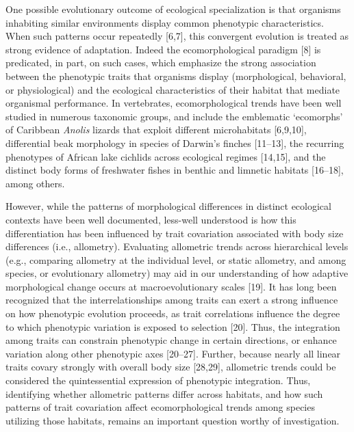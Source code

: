 \documentclass[
  11pt,
]{article}
\begin{document}
One possible evolutionary outcome of ecological specialization is that
organisms inhabiting similar environments display common phenotypic
characteristics. When such patterns occur repeatedly {[}6,7{]}, this
convergent evolution is treated as strong evidence of adaptation. Indeed
the ecomorphological paradigm {[}8{]} is predicated, in part, on such
cases, which emphasize the strong association between the phenotypic
traits that organisms display (morphological, behavioral, or
physiological) and the ecological characteristics of their habitat that
mediate organismal performance. In vertebrates, ecomorphological trends
have been well studied in numerous taxonomic groups, and include the
emblematic `ecomorphs' of Caribbean \emph{Anolis} lizards that exploit
different microhabitats {[}6,9,10{]}, differential beak morphology in
species of Darwin's finches {[}11--13{]}, the recurring phenotypes of
African lake cichlids across ecological regimes {[}14,15{]}, and the
distinct body forms of freshwater fishes in benthic and limnetic
habitats {[}16--18{]}, among others. \hfill\break

However, while the patterns of morphological differences in distinct
ecological contexts have been well documented, less-well understood is
how this differentiation has been influenced by trait covariation
associated with body size differences (i.e., allometry). Evaluating
allometric trends across hierarchical levels (e.g., comparing allometry
at the individual level, or static allometry, and among species, or
evolutionary allometry) may aid in our understanding of how adaptive
morphological change occurs at macroevolutionary scales {[}19{]}. It has
long been recognized that the interrelationships among traits can exert
a strong influence on how phenotypic evolution proceeds, as trait
correlations influence the degree to which phenotypic variation is
exposed to selection {[}20{]}. Thus, the integration among traits can
constrain phenotypic change in certain directions, or enhance variation
along other phenotypic axes {[}20--27{]}. Further, because nearly all
linear traits covary strongly with overall body size {[}28,29{]},
allometric trends could be considered the quintessential expression of
phenotypic integration. Thus, identifying whether allometric patterns
differ across habitats, and how such patterns of trait covariation
affect ecomorphological trends among species utilizing those habitats,
remains an important question worthy of investigation. \hfill\break
\end{document}
